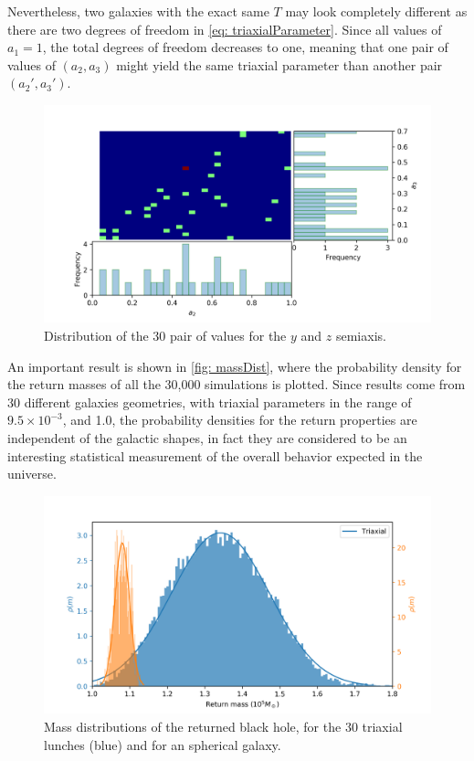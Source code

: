 	Nevertheless, two galaxies with the exact same $T$ may look completely different as there are two degrees of freedom in \autoref{eq: triaxialParameter}. Since all values of $a_1 = 1$, the total degrees of freedom decreases to one, meaning that one pair of values of $(a_2, a_3)$ might yield the same triaxial parameter than another pair $(a_2', a_3')$.
	
	\begin{figure}[h]
		\centering
		\includegraphics[width = 0.9\linewidth]{"../Files/Week 13/triaxial_axes"}
		\caption{Distribution of the 30 pair of values for the $y$ and $z$ semiaxis.}
		\label{fig: semiaxisDist}
	\end{figure}

	An important result is shown in \autoref{fig: massDist}, where the probability density for the return masses of all the 30,000 simulations is plotted. Since results come from 30 different galaxies geometries, with triaxial parameters in the range of $9.5\times10^{-3}$, and 1.0, the probability densities for the return properties are independent of the galactic shapes, in fact they are considered to be an interesting statistical measurement of the overall behavior expected in the universe.
	\begin{figure}[h]
		\centering
		\includegraphics[width=0.7\linewidth]{"../Files/Week 14/dist_masses"}
		\caption{Mass distributions of the returned black hole, for the 30 triaxial lunches (blue) and for an spherical galaxy.}
		\label{fig: massDist}
	\end{figure}

